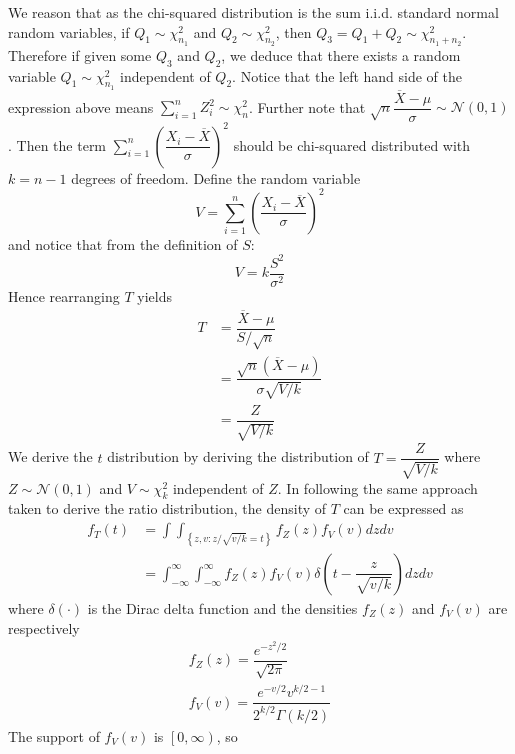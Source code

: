 \documentclass[11pt]{report} %
\begin{document}
We reason that as the chi-squared distribution is the sum i.i.d. standard normal random variables, if $Q_{1}\sim\chi_{n_{1}}^{2}$ and $Q_{2}\sim\chi_{n_{2}}^{2}$, then $Q_{3} = Q_{1} + Q_{2} \sim \chi_{n_{1} + n_{2}}^{2}$. Therefore if given some $Q_{3}$ and $Q_{2}$, we deduce that there exists a random variable $Q_{1} \sim \chi_{n_{1}}^{2}$ independent of $Q_{2}$. Notice that the left hand side of the expression above means $\sum_{i = 1}^{n}Z_{i}^{2} \sim \chi_{n}^{2}$. Further note that $\sqrt{n}\dfrac{\overline{X}-\mu}{\sigma} \sim \mathcal{N}\left(0, 1\right)$. Then the term $\sum_{i=1}^{n}\left(\dfrac{X_{i}-\overline{X}}{\sigma}\right)^{2}$ should be chi-squared distributed with $k = n - 1$ degrees of freedom. Define the random variable
\begin{equation}
V = \sum_{i=1}^{n}\left(\dfrac{X_{i}-\overline{X}}{\sigma}\right)^{2}
\end{equation}
and notice that from the definition of $S$:
\begin{equation}
V = k\dfrac{S^{2}}{\sigma^{2}}
\end{equation}
Hence rearranging $T$ yields
\begin{align}
T &= \dfrac{\overline{X} - \mu}{S/\sqrt{n}} \\
&= \dfrac{\sqrt{n}\left(\overline{X} - \mu\right)}{\sigma\sqrt{V/k}} \\
&= \dfrac{Z}{\sqrt{V/k}}
\end{align}
We derive the $t$ distribution by deriving the distribution of $T = \dfrac{Z}{\sqrt{V/k}}$ where $Z\sim\mathcal{N}\left(0, 1\right)$ and $V\sim\chi_{k}^{2}$ independent of $Z$. In following the same approach taken to derive the ratio distribution, the density of $T$ can be expressed as
\begin{align}
f_{T}\left(t\right) &= \int\int_{\left\{ z,v:z/\sqrt{v/k}=t\right\} }f_{Z}\left(z\right)f_{V}\left(v\right)dzdv \\
&= \int_{-\infty}^{\infty}\int_{-\infty}^{\infty}f_{Z}\left(z\right)f_{V}\left(v\right)\delta\left(t-\dfrac{z}{\sqrt{v/k}}\right)dzdv
\end{align}
where $\delta\left(\cdot\right)$ is the Dirac delta function and the densities $f_{Z}\left(z\right)$ and $f_{V}\left(v\right)$ are respectively
\begin{gather}
f_{Z}\left(z\right)=\dfrac{e^{-z^{2}/2}}{\sqrt{2\pi}} \\
f_{V}\left(v\right)=\dfrac{e^{-v/2}v^{k/2-1}}{2^{k/2}\Gamma\left(k/2\right)}
\end{gather}
The support of $f_{V}\left(v\right)$ is $\left[0, \infty\right)$, so
\end{document}
